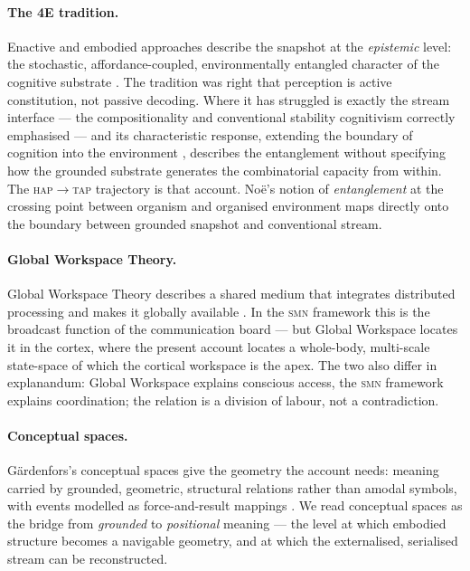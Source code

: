 \documentclass{article}
\newcommand{\smn}{\textsc{smn}}
\newcommand{\hap}{\textsc{hap}}
\newcommand{\tap}{\textsc{tap}}
\begin{document}
\paragraph{The 4E tradition.} Enactive and embodied approaches describe the snapshot at the \emph{epistemic} level: the stochastic, affordance-coupled, environmentally entangled character of the cognitive substrate \citep{varela1991embodied,Noe2004ActionVision}. The tradition was right that perception is active constitution, not passive decoding. Where it has struggled is exactly the stream interface --- the compositionality and conventional stability cognitivism correctly emphasised --- and its characteristic response, extending the boundary of cognition into the environment \citep{ClarkChalmers1998Extended,Hutchins1995-bt}, describes the entanglement without specifying how the grounded substrate generates the combinatorial capacity from within. The \hap$\to$\tap{} trajectory is that account. No\"e's notion of \emph{entanglement} at the crossing point between organism and organised environment \citep{Noe2015} maps directly onto the boundary between grounded snapshot and conventional stream.

\paragraph{Global Workspace Theory.} Global Workspace Theory describes a shared medium that integrates distributed processing and makes it globally available \citep{Baars1988CognitiveTheory,Dehaene2014Consciousness}. In the \smn{} framework this is the broadcast function of the communication board --- but Global Workspace locates it in the cortex, where the present account locates a whole-body, multi-scale state-space of which the cortical workspace is the apex. The two also differ in explanandum: Global Workspace explains conscious access, the \smn{} framework explains coordination; the relation is a division of labour, not a contradiction.

\paragraph{Conceptual spaces.} G\"ardenfors's conceptual spaces give the geometry the account needs: meaning carried by grounded, geometric, structural relations rather than amodal symbols, with events modelled as force-and-result mappings \citep{Gardenfors2020Events,Gardenfors2019Robot}. We read conceptual spaces as the bridge from \emph{grounded} to \emph{positional} meaning --- the level at which embodied structure becomes a navigable geometry, and at which the externalised, serialised stream can be reconstructed.
\end{document}
